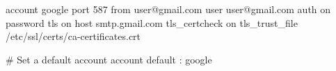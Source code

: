 account google
port 587
from user@gmail.com
user user@gmail.com
auth on
password
tls on
host smtp.gmail.com
tls_certcheck on
tls_trust_file /etc/ssl/certs/ca-certificates.crt

# Set a default account
account default : google
